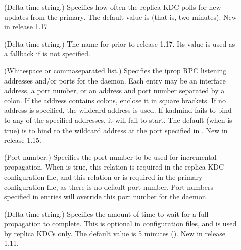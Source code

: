\documentclass[letterpaper,10pt,english]{sphinxmanual}
\begin{document}
\begin{description}
\item[{}] \leavevmode
\sphinxAtStartPar
(Delta time string.)  Specifies how often the replica KDC polls
for new updates from the primary.  The default value is 
(that is, two minutes).  New in release 1.17.

\item[{}] \leavevmode
\sphinxAtStartPar
(Delta time string.)  The name for  prior to
release 1.17.  Its value is used as a fallback if
 is not specified.

\item[{}] \leavevmode
\sphinxAtStartPar
(Whitespace\sphinxhyphen{} or comma\sphinxhyphen{}separated list.)  Specifies the iprop RPC
listening addresses and/or ports for the {\hyperref[\detokenize{admin/admin_commands/kadmind:kadmind-8}]{}} daemon.
Each entry may be an interface address, a port number, or an
address and port number separated by a colon.  If the address
contains colons, enclose it in square brackets.  If no address is
specified, the wildcard address is used.  If kadmind fails to bind
to any of the specified addresses, it will fail to start.  The
default (when  is true) is to bind to the wildcard
address at the port specified in .  New in release
1.15.

\item[{}] \leavevmode
\sphinxAtStartPar
(Port number.)  Specifies the port number to be used for
incremental propagation.  When  is true, this
relation is required in the replica KDC configuration file, and
this relation or  is required in the primary
configuration file, as there is no default port number.  Port
numbers specified in  entries will override this
port number for the {\hyperref[\detokenize{admin/admin_commands/kadmind:kadmind-8}]{}} daemon.

\item[{}] \leavevmode
\sphinxAtStartPar
(Delta time string.)  Specifies the amount of time to wait for a
full propagation to complete.  This is optional in configuration
files, and is used by replica KDCs only.  The default value is 5
minutes ().  New in release 1.11.


\end{description}
\end{document}
